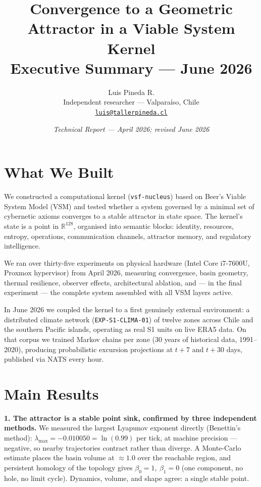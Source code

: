 \documentclass[11pt, a4paper]{article}
\title{%
  \textbf{Convergence to a Geometric Attractor in a Viable System Kernel}\\[4pt]
  \large Executive Summary --- June 2026
}
\author{Luis Pineda R.\\
  \small Independent researcher --- Valpara\'{i}so, Chile\\
  \small \href{mailto:luis@tallerpineda.cl}{\texttt{luis@tallerpineda.cl}}}
\date{\textit{Technical Report --- April 2026; revised June 2026}}
\newcommand{\R}{\mathbb{R}}
\newcommand{\nucleus}{\texttt{vsf-nucleus}}
\begin{document}
\maketitle

\section*{What We Built}

We constructed a computational kernel (\nucleus{}) based on Beer's Viable System
Model (VSM) and tested whether a system governed by a minimal set of cybernetic axioms
converges to a stable attractor in state space. The kernel's state is a point in
$\R^{128}$, organised into semantic blocks: identity, resources, entropy, operations,
communication channels, attractor memory, and regulatory intelligence.

We ran over thirty-five experiments on physical hardware (Intel Core i7-7600U, Proxmox
hypervisor) from April 2026, measuring convergence, basin geometry, thermal
resilience, observer effects, architectural ablation, and --- in the final experiment
--- the complete system assembled with all VSM layers active.

In June 2026 we coupled the kernel to a first genuinely external environment: a
distributed climate network (\texttt{EXP-S1-CLIMA-01}) of twelve zones across Chile
and the southern Pacific islands, operating as real S1 units on live ERA5 data.
On that corpus we trained Markov chains per zone (30 years of historical data,
1991--2020), producing probabilistic excursion projections at $t{+}7$ and $t{+}30$
days, published via NATS every hour.

\section*{Main Results}

\textbf{1. The attractor is a stable point sink, confirmed by three independent
methods.} We measured the largest Lyapunov exponent directly (Benettin's method):
$\lambda_\text{max} = -0{.}010050 = \ln(0{.}99)$ per tick, at machine precision ---
negative, so nearby trajectories contract rather than diverge. A Monte-Carlo estimate
places the basin volume at $\approx 1{.}0$ over the reachable region, and persistent
homology of the topology gives $\beta_0 = 1,\ \beta_1 = 0$ (one component, no hole,
no limit cycle). Dynamics, volume, and shape agree: a single stable point.
\end{document}
